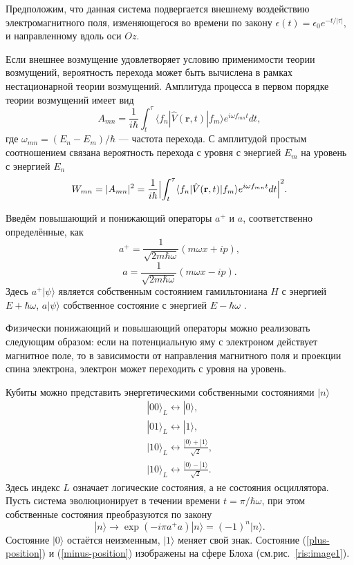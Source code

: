 \documentclass[14pt,a4paper]{PhDthesis}
\begin{document}
Предположим, что данная система подвергается внешнему воздействию электромагнитного поля, изменяющегося во времени по закону 
$\epsilon (t) = \epsilon _{0} e^{-t/|\tau|}$, и направленному вдоль оси $Oz$. 

Если внешнее возмущение удовлетворяет условию применимости теории возмущений, вероятность перехода может быть вычислена в рамках нестационарной теории возмущений. Амплитуда процесса в первом порядке теории возмущений имеет вид 
\begin{equation}
A_{mn} = \frac{1}{i \hbar} \int_{t}^{\tau} \langle f_{n}  |\hat{V}(\textbf{r}, t)|f_{m}\rangle e^{i \omega f_{mn} t} dt,
\end{equation}
где $\omega_{mn} = (E_{n} - E_{m})/\hbar$ --- частота перехода. С амплитудой простым соотношением связана вероятность перехода с уровня с энергией $E_{m}$ на уровень с энергией $E_{n}$
\begin{equation}
W_{mn} = | A_{mn}|^{2} = \frac{1}{i \hbar} \Bigl |\int_{t}^{\tau} \langle f_{n}  |\hat{V}(\textbf{r}, t)|f_{m}\rangle e^{i \omega f_{mn} t} dt \Bigr |^{2}.
\end{equation}

Введём повышающий и понижающий операторы $a^{+}$ и $a$,  соответственно определённые, как
\begin{equation}
a^{+} = \frac{1}{\sqrt{2m \hbar \omega}} (m \omega x + ip),
\end{equation}
\begin{equation}
a = \frac{1}{\sqrt{2m \hbar \omega}} (m \omega x - ip).
\end{equation}
Здесь $a^{+}|\psi\rangle$ является собственным состоянием гамильтониана $H$ с энергией $E + \hbar\omega$, $a|\psi\rangle$ собственное состояние с энергией  $E - \hbar\omega$ \cite{Nilsen:2001ru}.

Физически понижающий и повышающий операторы можно реализовать следующим образом: если на потенциальную яму с электроном действует магнитное поле, то в зависимости от направления магнитного поля и проекции спина электрона, электрон может переходить с уровня на уровень.

Кубиты можно представить энергетическими собственными состояниями $|n\rangle$
\begin{eqnarray}
|00\rangle_{L} \longleftrightarrow |0\rangle,   \\
|01\rangle_{L} \longleftrightarrow |1\rangle,\\
|10\rangle_{L} \longleftrightarrow \frac{|0\rangle + |1\rangle}{\sqrt{2}} \label{plus-position},\\
|10\rangle_{L} \longleftrightarrow \frac{|0\rangle - |1\rangle}{\sqrt{2}} \label{minus-position}.
\end{eqnarray}
Здесь индекс $L$ означает логические состояния, а не состояния осциллятора.
Пусть система эволюционирует в течении времени $t = \pi / \hbar\omega$, при этом собственные состояния преобразуются по закону
\begin{equation}
|n\rangle \rightarrow \exp(-i\pi a^{+} a)|n\rangle = (-1)^{n}|n\rangle.
\end{equation}
Состояние $|0\rangle$ остаётся неизменным, $|1\rangle$ меняет свой знак.
Состояние (\ref{plus-position}) и (\ref{minus-position}) изображены на сфере Блоха (см.рис.~\ref{ris:image1}).
\end{document}
